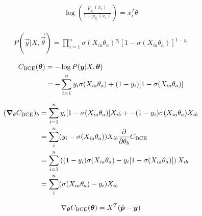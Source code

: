     \begin{align*}
        \log(\frac{p_{y_i}(x_i)}{1-p_{y_i}(x_i)}) = x_i^T \theta
    \end{align*}

    \begin{align*}
        P(\vec{y}|X,\vec{\vec{\theta}}) = \prod_{i = 1}^{n} \sigma(X_{ia} \theta_a)^{y_i}[1-\sigma(X_{ia}\theta_a)]^{1 - y_i} 
    \end{align*}

    \begin{align*}
        {C}_\text{BCE}(\boldsymbol{\theta}) &= -\log P(\boldsymbol{y}|X,\boldsymbol{\boldsymbol{\theta}}) \\ 
        &= - \sum_{i = 1}^{n} y_i \sigma(X_{ia} \theta_a) + (1 - y_i)[1-\sigma(X_{ia}\theta_a)]
    \end{align*}

    \begin{align*}
        (\grad_{\theta} \msub{C}{BCE})_b &= \sum_{i = 1}^{n} y_i [1 - \sigma(X_{ia} \theta_a) ] X_{ib} + -(1 - y_i)\sigma(X_{ia} \theta_a)X_{ib} \\
        &= \sum_i^n (y_i - \sigma(X_{ia}\theta_a)) X_{ib}  
        \pdv{\theta_b} \msub{C}{BCE} \\
        &= \sum_{i = 1}^{n} \left( (1 - y_i)\sigma(X_{ia} \theta_a) - y_i [1 - \sigma(X_{ia} \theta_a) ] \right) X_{ib} \\
        &= \sum_i^n (\sigma(X_{ia}\theta_a)- y_i) X_{ib}  
    \end{align*}

    \begin{align*}
        \nabla_{\boldsymbol{\theta}} {C}_\text{BCE}(\boldsymbol{\theta}) = X^T (\hat{\boldsymbol{p}} - \boldsymbol{y}) 
    \end{align*}